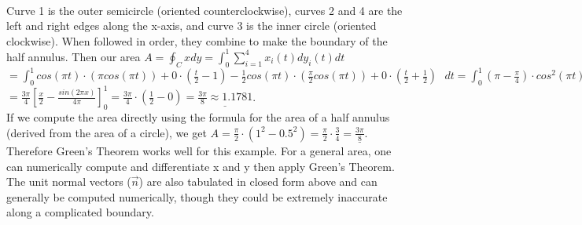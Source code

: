 \documentclass{article}
\begin{document}
\mbox{}\\
Curve 1 is the outer semicircle (oriented counterclockwise), curves 2 and 4 are the left and right edges along the x-axis, and curve 3 is the inner circle (oriented clockwise). When followed in order, they combine to make the boundary of the half annulus. Then our area $A=\oint_{C}xdy=\int_{0}^{1}\sum_{i=1}^{4}x_i(t)dy_i(t)dt$\\ $=\int_{0}^{1}cos(\pi t)\cdot(\pi cos(\pi t))+0\cdot(\frac{t}{2}-1)-\frac{1}{2}cos(\pi t)\cdot(\frac{\pi}{2} cos(\pi t))+0\cdot(\frac{t}{2}+\frac{1}{2})\mbox{ }dt=\int_{0}^{1}(\pi-\frac{\pi}{4})\cdot cos^2(\pi t)dt$\\ $=\frac{3\pi}{4}[\frac{x}{2}-\frac{sin(2\pi x)}{4\pi}]_0^1=\frac{3\pi}{4}\cdot(\frac{1}{2}-0)=\underline{\frac{3\pi}{8}\approx1.1781}$.\\
If we compute the area directly using the formula for the area of a half annulus (derived from the area of a circle), we get $A=\frac{\pi}{2}\cdot(1^2-0.5^2)=\frac{\pi}{2}\cdot\frac{3}{4}=\underline{\frac{3\pi}{8}}$. Therefore Green's Theorem works well for this example. For a general area, one can numerically compute and differentiate x and y then apply Green's Theorem. The unit normal vectors ($\vec{n}$) are also tabulated in closed form above and can generally be computed numerically, though they could be extremely inaccurate along a complicated boundary.
\end{document}

